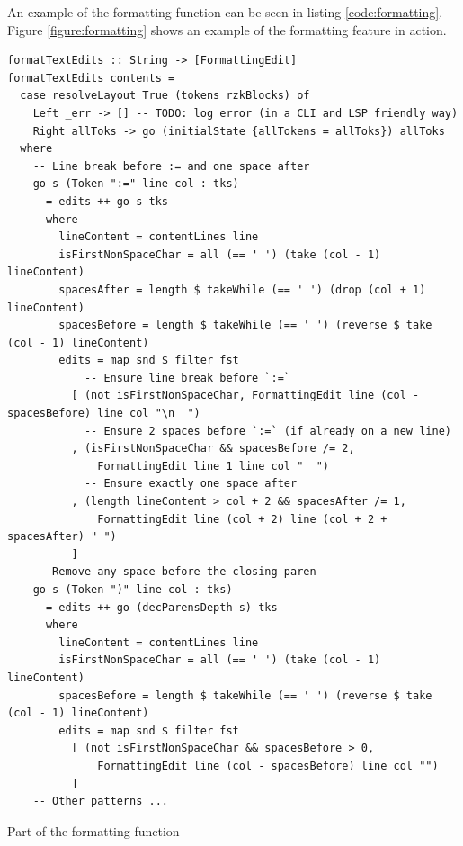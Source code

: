 An example of the formatting function can be seen in listing \ref{code:formatting}.
Figure \ref{figure:formatting} shows an example of the formatting feature in action.

\begin{listing}
  \begin{verbatim}
formatTextEdits :: String -> [FormattingEdit]
formatTextEdits contents =
  case resolveLayout True (tokens rzkBlocks) of
    Left _err -> [] -- TODO: log error (in a CLI and LSP friendly way)
    Right allToks -> go (initialState {allTokens = allToks}) allToks
  where
    -- Line break before := and one space after
    go s (Token ":=" line col : tks)
      = edits ++ go s tks
      where
        lineContent = contentLines line
        isFirstNonSpaceChar = all (== ' ') (take (col - 1) lineContent)
        spacesAfter = length $ takeWhile (== ' ') (drop (col + 1) lineContent)
        spacesBefore = length $ takeWhile (== ' ') (reverse $ take (col - 1) lineContent)
        edits = map snd $ filter fst
            -- Ensure line break before `:=`
          [ (not isFirstNonSpaceChar, FormattingEdit line (col - spacesBefore) line col "\n  ")
            -- Ensure 2 spaces before `:=` (if already on a new line)
          , (isFirstNonSpaceChar && spacesBefore /= 2,
              FormattingEdit line 1 line col "  ")
            -- Ensure exactly one space after
          , (length lineContent > col + 2 && spacesAfter /= 1,
              FormattingEdit line (col + 2) line (col + 2 + spacesAfter) " ")
          ]
    -- Remove any space before the closing paren
    go s (Token ")" line col : tks)
      = edits ++ go (decParensDepth s) tks
      where
        lineContent = contentLines line
        isFirstNonSpaceChar = all (== ' ') (take (col - 1) lineContent)
        spacesBefore = length $ takeWhile (== ' ') (reverse $ take (col - 1) lineContent)
        edits = map snd $ filter fst
          [ (not isFirstNonSpaceChar && spacesBefore > 0,
              FormattingEdit line (col - spacesBefore) line col "")
          ]
    -- Other patterns ...
  \end{verbatim}
  \caption{Part of the formatting function}
  \label{code:formatting}
\end{listing}

